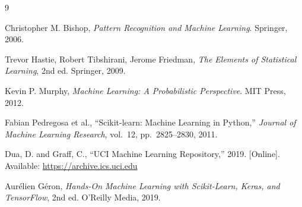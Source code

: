 \documentclass[12pt, a4paper]{article}
\begin{document}

\begin{thebibliography}{9}

  Christopher M. Bishop,
  \textit{Pattern Recognition and Machine Learning}.
  Springer, 2006.

  Trevor Hastie, Robert Tibshirani, Jerome Friedman,
  \textit{The Elements of Statistical Learning}, 2nd ed.
  Springer, 2009.

  Kevin P. Murphy,
  \textit{Machine Learning: A Probabilistic Perspective}.
  MIT Press, 2012.

  Fabian Pedregosa et al.,
  ``Scikit-learn: Machine Learning in Python,''
  \textit{Journal of Machine Learning Research}, vol.~12, pp.~2825--2830, 2011.

  Dua, D. and Graff, C.,
  ``UCI Machine Learning Repository,'' 2019.
  [Online]. Available: \url{https://archive.ics.uci.edu}

  Aurélien Géron,
  \textit{Hands-On Machine Learning with Scikit-Learn, Keras, and TensorFlow},
  2nd ed. O'Reilly Media, 2019.
  
\end{thebibliography}
\end{document}

